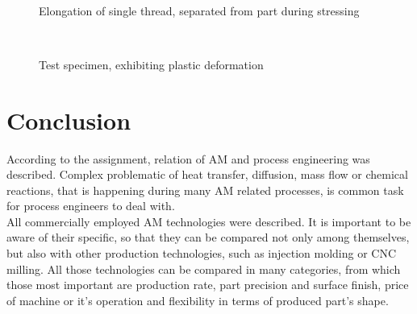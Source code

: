 \documentclass[a4paper, 11pt, reqno]{report}
\begin{document}
\begin{figure}[h!]
\begin{minipage}[b]{0.48\textwidth}
  \end{minipage}
  \\[1pt]
  \begin{minipage}[t]{0.48\textwidth}
    \caption{Elongation of single thread, separated from part during stressing}
  \end{minipage}
  \hfill
  \begin{minipage}[t]{0.48\textwidth}
    \caption{Test specimen, exhibiting plastic deformation}
  \end{minipage}
  \\[5pt]
\end{figure}
%
%
\chapter{Conclusion}

	According to the assignment, relation of AM and process engineering was described. Complex problematic of heat transfer, diffusion, mass flow or chemical reactions, that is happening during many AM related processes, is common task for process engineers to deal with.
\\[10pt]

	All commercially employed AM technologies were described. It is important to be aware of their specific, so that they can be compared not only among themselves, but also with other production technologies, such as injection molding or CNC milling. All those technologies can be compared in many categories, from which those most important are production rate, part precision and surface finish, price of machine or it's operation and flexibility in terms of produced part's shape.
\\[10pt]
\end{document}

